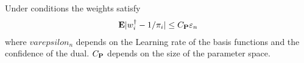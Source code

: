 \begin{theorem}
  Under conditions
  the weights satisfy
  \begin{gather}
    \E|w_i^\dagger-1/\pi_i|
    \le
    C_\P
    \varepsilon_n
  \end{gather}
  where 
  $varepsilon_n$ depends on the Learning rate of the basis functions
  and the confidence of the dual.
  $C_\P$ depends on the size of the parameter space.
\end{theorem}
